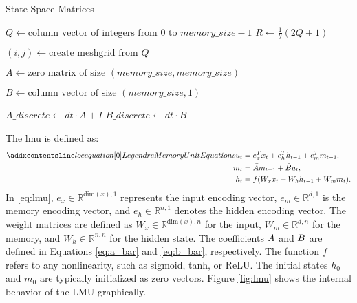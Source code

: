 \begin{algorithm}[H]
\caption{State Space Matrices}
\label{alg:ssm}
$Q \gets \text{column vector of integers from } 0 \text{ to } memory\_size-1$\;
$R \gets \frac{1}{\theta}(2 Q + 1)$\;

$(i, j) \gets \text{create meshgrid from } Q$\;

$A \gets \text{zero matrix of size } (memory\_size, memory\_size)$\;

$B \gets \text{column vector of size } (memory\_size, 1)$\;

$A\_discrete \gets dt \cdot A + I$\;
$B\_discrete \gets dt \cdot B$\;

\end{algorithm}
\vspace{3mm}

The \gls{lmu} is defined as:
\begin{align}
\label{eq:lmu}
\setequationentry{Legendre Memory Unit Equations}
    u_t &= e_x^T x_t + e_h^T h_{t-1} + e_m^T m_{t-1}, \\
    m_t &= \Bar{A} m_{t-1} + \Bar{B} u_t, \\
    h_t &= f(W_x x_t + W_h h_{t-1} + W_m m_t).
\end{align}
In \ref{eq:lmu}, \(e_x \in \mathbb{R}^{\text{dim}(x),1}\) represents the input encoding vector, \(e_m \in \mathbb{R}^{d,1}\) is the memory encoding vector, and \(e_h \in \mathbb{R}^{n,1}\) denotes the hidden encoding vector. The weight matrices are defined as \(W_x \in \mathbb{R}^{\text{dim}(x),n}\) for the input, \(W_m \in \mathbb{R}^{d,n}\) for the memory, and \(W_h \in \mathbb{R}^{n,n}\) for the hidden state. The coefficients \(\Bar{A}\) and \(\Bar{B}\) are defined in Equations \eqref{eq:a_bar} and \eqref{eq:b_bar}, respectively. The function \(f\) refers to any nonlinearity, such as sigmoid, tanh, or ReLU. The initial states \(h_0\) and \(m_0\) are typically initialized as zero vectors. Figure \ref{fig:lmu} shows the internal behavior of the LMU graphically.



